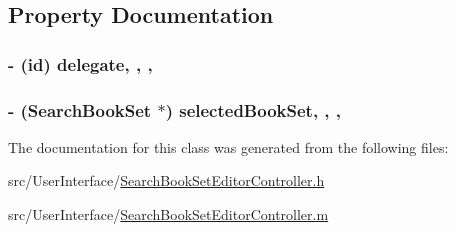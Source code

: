 \subsection{Property Documentation}
\hypertarget{interface_search_book_set_editor_controller_a8d9332fcd23523b1e2520b8765577423}{
\subsubsection[{delegate}]{\setlength{\rightskip}{0pt plus 5cm}-\/ (id) delegate\hspace{0.3cm}{\ttfamily [read]}, {\ttfamily [write]}, {\ttfamily [atomic]}, {\ttfamily [assign]}}}\label{interface_search_book_set_editor_controller_a8d9332fcd23523b1e2520b8765577423}
\hypertarget{interface_search_book_set_editor_controller_a35dcbb446afbd110db22bcdffecb2f8d}{
\subsubsection[{selected\-Book\-Set}]{\setlength{\rightskip}{0pt plus 5cm}-\/ ({\bf Search\-Book\-Set} $\ast$) selected\-Book\-Set\hspace{0.3cm}{\ttfamily [read]}, {\ttfamily [write]}, {\ttfamily [atomic]}, {\ttfamily [retain]}}}\label{interface_search_book_set_editor_controller_a35dcbb446afbd110db22bcdffecb2f8d}


The documentation for this class was generated from the following files\-:\begin{DoxyCompactItemize}
\item 
src/\-User\-Interface/\hyperlink{_search_book_set_editor_controller_8h}{Search\-Book\-Set\-Editor\-Controller.\-h}\item 
src/\-User\-Interface/\hyperlink{_search_book_set_editor_controller_8m}{Search\-Book\-Set\-Editor\-Controller.\-m}\end{DoxyCompactItemize}
